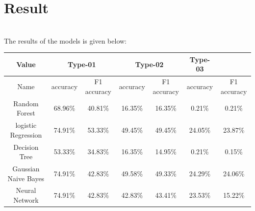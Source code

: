 \documentclass[letterpaper,11pt]{article}
\begin{document}
\section{Result}
\\The results of the models is given below:
\begin{table}
\begin{center}
\label{table1} 
\begin{tabular}{ccccccc} 
\hline
\multicolumn{1}{c}{Value} & \multicolumn{2}{c}{Type-01} & \multicolumn{2}{c}{Type-02}& \multicolumn{1}{c}{Type-03}\\
\hline
Name & 	accuracy &	F1 accuracy &	accuracy &	F1 accuracy &	accuracy &	F1 accuracy\\
Random Forest &	68.96\%	& 40.81\%	& 16.35\% &	16.35\% &	0.21\% &	0.21\% \\
logistic Regression &	74.91\%	& 53.33\% &	49.45\%	& 49.45\% &	24.05\%	& 23.87\%\\
Decision Tree &	53.33\% &	34.83\% &	16.35\%	& 14.95\% &	0.21\% &	0.15\% \\
Gaussian Naive Bayes &	74.91\% &	42.83\% &	49.58\%	& 49.33\% &	24.29\% &	24.06\%\\
Neural Network &	74.91\% &	42.83\%	& 42.83\% &	43.41\% &	23.53\%	& 15.22\%\\
\hline
\end{tabular}
\end{center}
\end{table}
\end{document}
